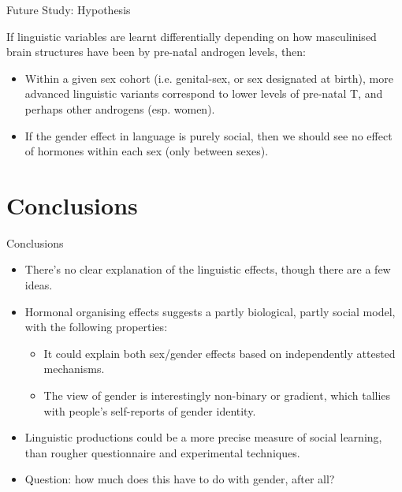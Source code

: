 \documentclass[hyperref={pdfpagelabels=false}]{beamer}
\begin{document}
\begin{frame}{Future Study: Hypothesis}

\begin{center}
\item If linguistic variables are learnt differentially depending on how masculinised brain structures have been by pre-natal androgen levels, then:
\end{center} 
\begin{itemize}
	\item Within a given sex cohort (i.e. genital-sex, or sex designated at birth), more advanced linguistic variants correspond to lower levels of pre-natal T, and perhaps other androgens (esp. women).
	\item If the gender effect in language is purely social, then we should see no effect of hormones within each sex (only between sexes).
\end{itemize}
\end{frame}





\section{Conclusions}


\begin{frame}{Conclusions}
		\begin{itemize}
			\item There's no clear explanation of the linguistic effects, though there are a few ideas.
			\item Hormonal organising effects suggests a partly biological, partly social model, with the following properties:
		\begin{itemize}
			\item It could explain both sex/gender effects based on independently attested mechanisms.
			\item The view of gender is interestingly non-binary or gradient, which tallies with people's self-reports of gender identity.
			\end{itemize}
			\item Linguistic productions could be a more precise measure of social learning, than rougher questionnaire and experimental techniques.
			\item Question: how much does this have to do with gender, after all?
	\end{itemize}
\end{frame}
\end{document}
